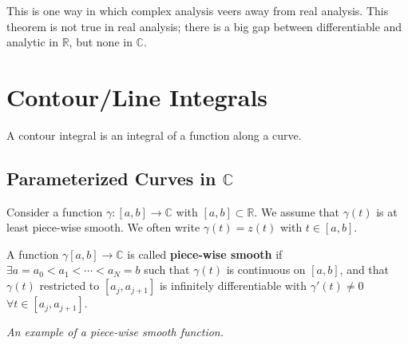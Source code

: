 \begin{remark}
This is one way in which complex analysis veers away from real analysis. This theorem is not true in real analysis; there is a big gap between differentiable and analytic in $\mathbb{R}$, but none in $\mathbb{C}$.
\end{remark}

\section{Contour/Line Integrals}
A contour integral is an integral of a function along a curve.

\subsection{Parameterized Curves in $\mathbb{C}$}

Consider a function $\gamma:[a,b] \rightarrow \mathbb{C}$ with $[a,b] \subset \mathbb{R}$. We assume that $\gamma(t)$ is at least piece-wise smooth. We often write $\gamma(t)=z(t)$ with $t\in [a,b]$.


\begin{definition}
A function $\gamma [a,b] \rightarrow \mathbb{C}$ is called \textbf{piece-wise smooth} if $\exists a=a_0<a_1< \cdots < a_N = b$ such that $\gamma(t)$ is continuous on $[a,b]$, and that $\gamma(t)$ restricted to $[a_j,a_{j+1}]$ is infinitely differentiable with $\gamma'(t)\neq 0$ $\forall t\in [a_j,a_{j+1}]$.
\end{definition}

\begin{center}


\textit{An example of a piece-wise smooth function.}
\end{center}


